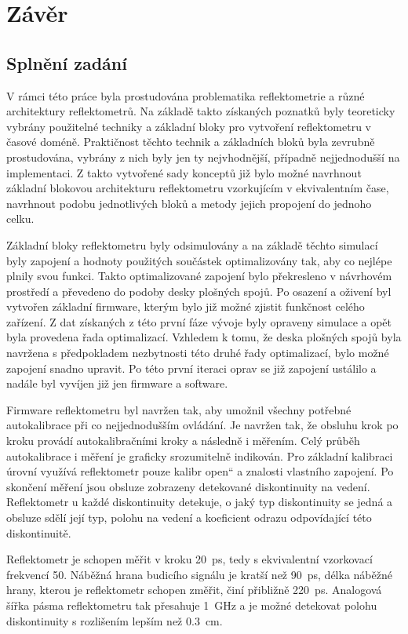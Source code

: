 \chapter{Závěr}

\section{Splnění zadání}
V rámci této práce byla prostudována problematika reflektometrie a různé architektury reflektometrů. Na základě takto získaných poznatků byly teoreticky vybrány použitelné techniky a základní bloky pro vytvoření reflektometru v časové doméně. Praktičnost těchto technik a základních bloků byla zevrubně prostudována, vybrány z nich byly jen ty nejvhodnější, případně nejjednodušší na implementaci. Z takto vytvořené sady konceptů již bylo možné navrhnout základní blokovou architekturu reflektometru vzorkujícím v ekvivalentním čase, navrhnout podobu jednotlivých bloků a metody jejich propojení do jednoho celku. 

Základní bloky reflektometru byly odsimulovány a na základě těchto simulací byly zapojení a hodnoty použitých součástek optimalizovány tak, aby co nejlépe plnily svou funkci. Takto optimalizované zapojení bylo překresleno v návrhovém prostředí a převedeno do podoby desky plošných spojů. Po osazení a oživení byl vytvořen základní firmware, kterým bylo již možné zjistit funkčnost celého zařízení. Z dat získaných z této první fáze vývoje byly opraveny simulace a opět byla provedena řada optimalizací. Vzhledem k tomu, že deska plošných spojů byla navržena s předpokladem nezbytnosti této druhé řady optimalizací, bylo možné zapojení snadno upravit. Po této první iteraci oprav se již zapojení ustálilo a nadále byl vyvíjen již jen firmware a software.

Firmware reflektometru byl navržen tak, aby umožnil všechny potřebné autokalibrace při co nejjednodušším ovládání. Je navržen tak, že obsluhu krok po kroku provádí autokalibračními kroky a následně i měřením. Celý průběh autokalibrace i měření je graficky srozumitelně indikován. Pro základní kalibraci úrovní využívá reflektometr pouze kalibr \quotedblbase open\textquotedblleft{} a znalosti vlastního zapojení. Po skončení měření jsou obsluze zobrazeny detekované diskontinuity na vedení. Reflektometr u každé diskontinuity detekuje, o jaký typ diskontinuity se jedná a obsluze sdělí její typ, polohu na vedení a koeficient odrazu odpovídající této diskontinuitě.

Reflektometr je schopen měřit v kroku \SI{20}{\pico\second}, tedy s ekvivalentní vzorkovací frekvencí \SI{50}{\gigasample}. Náběžná hrana budicího signálu je kratší než \SI{90}{\pico\second}, délka náběžné hrany, kterou je reflektometr schopen změřit, činí přibližně \SI{220}{\pico\second}. Analogová šířka pásma reflektometru tak přesahuje \SI{1}{\giga\hertz} a je možné detekovat polohu diskontinuity s rozlišením lepším než \SI{0.3}{\centi\meter}.

